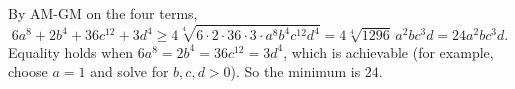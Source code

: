 By AM-GM on the four terms,
\[6a^8+2b^4+36c^{12}+3d^4\ge4\sqrt[4]{6\cdot2\cdot36\cdot3\cdot a^8b^4c^{12}d^4}=4\sqrt[4]{1296}\,a^2bc^3d=24a^2bc^3d.\]
Equality holds when $6a^8=2b^4=36c^{12}=3d^4$, which is achievable (for example, choose $a=1$ and solve for $b,c,d>0$). So the minimum is $\boxed{24}$.
